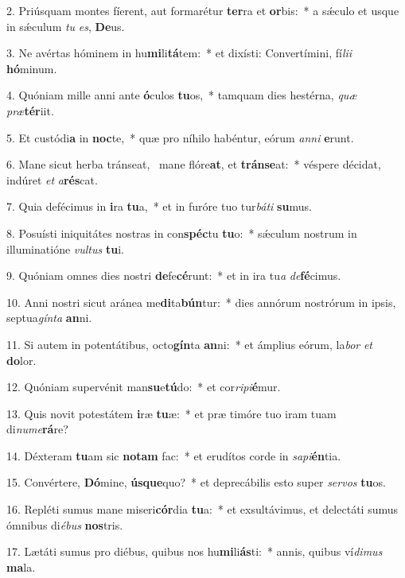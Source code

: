 2. Priúsquam montes fíerent, aut formarétur \textbf{ter}ra et \textbf{or}bis:~*  a sǽculo et usque in sǽculum \textit{tu} \textit{es}, \textbf{De}us.\

3. Ne avértas hóminem in hu\textbf{mi}li\textbf{tá}tem:~*  et dixísti: Convertímini, fí\textit{li}\textit{i} \textbf{hó}minum.\

4. Quóniam mille anni ante \textbf{ó}culos \textbf{tu}os,~*  tamquam dies hestérna, \textit{quæ} \textit{præ}\textbf{tér}iit.\

5. Et custódi\textbf{a} in \textbf{noc}te,~*  quæ pro níhilo habéntur, eórum \textit{an}\textit{ni} \textbf{e}runt.\

6. Mane sicut herba tránseat, \dag\  mane flóre\textbf{at}, et \textbf{tráns}\textbf{e}at:~*  véspere décidat, indúret \textit{et} \textit{a}\textbf{rés}cat.\

7. Quia defécimus in \textbf{i}ra \textbf{tu}a,~*  et in furóre tuo tur\textit{bá}\textit{ti} \textbf{su}mus.\

8. Posuísti iniquitátes nostras in con\textbf{spéc}tu \textbf{tu}o:~*  sǽculum nostrum in illuminatióne \textit{vul}\textit{tus} \textbf{tu}i.\

9. Quóniam omnes dies nostri \textbf{de}fe\textbf{cé}runt:~*  et in ira tu\textit{a} \textit{de}\textbf{fé}cimus.\

10. Anni nostri sicut aránea me\textbf{di}ta\textbf{bún}tur:~*  dies annórum nostrórum in ipsis, septua\textit{gín}\textit{ta} \textbf{an}ni.\

11. Si autem in potentátibus, octo\textbf{gín}ta \textbf{an}ni:~*  et ámplius eórum, la\textit{bor} \textit{et} \textbf{do}lor.\

12. Quóniam supervénit man\textbf{su}e\textbf{tú}do:~*  et cor\textit{ri}\textit{pi}\textbf{é}mur.\

13. Quis novit potestátem \textbf{i}ræ \textbf{tu}æ:~*  et præ timóre tuo iram tuam di\textit{nu}\textit{me}\textbf{rá}re?\

14. Déxteram \textbf{tu}am sic \textbf{no}\textbf{tam} fac:~*  et erudítos corde in \textit{sa}\textit{pi}\textbf{én}tia.\

15. Convértere, \textbf{Dó}mine, \textbf{ús}\textbf{que}quo?~*  et deprecábilis esto super \textit{ser}\textit{vos} \textbf{tu}os.\

16. Repléti sumus mane miseri\textbf{cór}dia \textbf{tu}a:~*  et exsultávimus, et delectáti sumus ómnibus di\textit{é}\textit{bus} \textbf{nos}tris.\

17. Lætáti sumus pro diébus, quibus nos hu\textbf{mi}li\textbf{ás}ti:~*  annis, quibus ví\textit{di}\textit{mus} \textbf{ma}la.\

